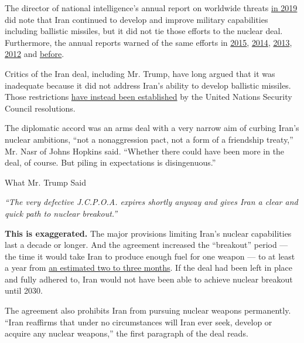The director of national intelligence's annual report on worldwide
threats
\href{https://www.dni.gov/files/ODNI/documents/2019-ATA-SFR---SSCI.pdf\#page=30}{in
2019} did note that Iran continued to develop and improve military
capabilities including ballistic missiles, but it did not tie those
efforts to the nuclear deal. Furthermore, the annual reports warned of
the same efforts in
\href{https://www.dni.gov/files/documents/Unclassified_2015_ATA_SFR_-_SASC_FINAL.pdf\#page=18}{2015},
\href{https://www.dni.gov/files/documents/Intelligence\%20Reports/2014\%20WWTA\%20\%20SFR_SSCI_29_Jan.pdf\#page=9}{2014},
\href{https://www.dni.gov/files/documents/Intelligence\%20Reports/UNCLASS_2013\%20ATA\%20SFR\%20FINAL\%20for\%20SASC\%2018\%20Apr\%202013.pdf\#page=13}{2013},
\href{https://www.dni.gov/files/documents/Newsroom/Testimonies/20120131_testimony_ata.pdf\#page=7}{2012}
and
\href{https://www.dni.gov/files/documents/Newsroom/Testimonies/20110310_testimony_clapper.pdf\#page=5}{before}.

Critics of the Iran deal, including Mr. Trump, have long argued that it
was inadequate because it did not address Iran's ability to develop
ballistic missiles. Those restrictions
\href{https://www.armscontrol.org/2015-08/appendix-e-iran\%E2\%80\%99s-ballistic-missiles-nuclear-deal}{have
instead been established} by the United Nations Security Council
resolutions.

The diplomatic accord was an arms deal with a very narrow aim of curbing
Iran's nuclear ambitions, ``not a nonaggression pact, not a form of a
friendship treaty,'' Mr. Nasr of Johns Hopkins said. ``Whether there
could have been more in the deal, of course. But piling in expectations
is disingenuous.''

What Mr. Trump Said

\emph{``The very defective J.C.P.O.A. expires shortly anyway and gives
Iran a clear and quick path to nuclear breakout.''}

\textbf{This is exaggerated.} The major provisions limiting Iran's
nuclear capabilities last a decade or longer. And the agreement
increased the ``breakout'' period --- the time it would take Iran to
produce enough fuel for one weapon --- to at least a year from
\href{https://fas.org/sgp/crs/nuke/R43333.pdf}{an estimated two to three
months}. If the deal had been left in place and fully adhered to, Iran
would not have been able to achieve nuclear breakout until 2030.

The agreement also prohibits Iran from pursuing nuclear weapons
permanently. ``Iran reaffirms that under no circumstances will Iran ever
seek, develop or acquire any nuclear weapons,'' the first paragraph of
the deal reads.

